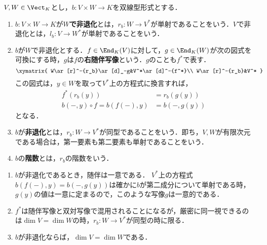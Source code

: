 \documentclass[uplatex, dvipdfmx]{jsreport}
\begin{document}
\begin{definition}
    $V,W\in\Vect_K$とし，$b:V\times W\to K$を双線型形式とする．
    \begin{enumerate}
        \item $b:V\times W\to K$が\textbf{$W$で非退化}とは，$r_b:W\to V^*$が単射であることをいう．$V$で非退化とは，$l_b:V\to W^*$が単射であることをいう．
        \item $b$が$W$で非退化とする．$f\in\End_K(V)$に対して，$g\in\End_K(W)$が次の図式を可換にする時，$g$は$f$の\textbf{右随伴写像}という．$g$のことも$f^*$で表す．
        \[\xymatrix{
            W\ar[r]^-{r_b}\ar[d]_-g&V^*\ar[d]^-{f^*}\\
            W\ar[r]^-{r_b}&V^*
        }\]
        この図式は，$y\in W$を取って$V^*$上の方程式に換言すれば，
        \begin{align*}
            f^*(r_b(y))&=r_b(g(y))\\
            b(-,y)\circ f=b(f(-),y)&=b(-,g(y))
        \end{align*}
        となる．
        \item $b$が\textbf{非退化}とは，$r_b:W\to V^*$が同型であることをいう．即ち，$V,W$が有限次元である場合は，第一要素も第二要素も単射であることをいう．
        \item $b$の\textbf{階数}とは，$r_b$の階数をいう．
    \end{enumerate}
\end{definition}
\begin{remark}[記号の混用]\mbox{}
    \begin{enumerate}
        \item $b$が非退化であるとき，随伴は一意である．
        $V^*$上の方程式$b(f(-),y)=b(-,g(y))$は確かに$b$が第二成分について単射である時，$g(y)$の値は一意に定まるので，このような写像$g$は一意的である．
        \item $f^*$は随伴写像と双対写像で混用されることになるが，厳密に同一視できるのは$\dim V=\dim W$の時，$r_b:W\to V^*$が同型の時に限る．
        \item $b$が非退化ならば，$\dim V=\dim W$である．
    \end{enumerate}
\end{remark}
\end{document}
